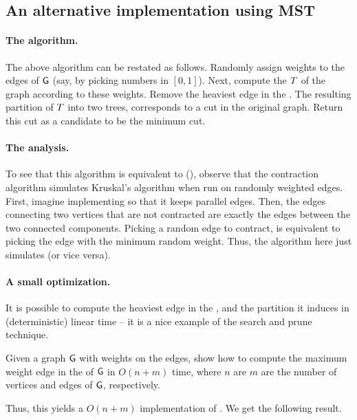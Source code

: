
\subsection{An alternative implementation using MST}

\paragraph*{The algorithm.}
The above algorithm can be restated as follows. Randomly assign
weights to the edges of $\mathsf{G}$ (say, by picking numbers in
$[0,1]$). Next, compute the \MST $T$ of the graph according to
these weights. Remove the heaviest edge in the \MST. The resulting
partition of $T$ into two trees, corresponds to a cut in the
original graph. Return this cut as a candidate to be the minimum cut. 

\paragraph*{The analysis.}
To see that this algorithm is equivalent to \MinCut
(), observe that the contraction algorithm
simulates Kruskal's \MST algorithm when run on randomly weighted
edges. First, imagine implementing \MinCut{} so that it keeps parallel
edges. Then, the edges connecting two vertices that are not
contracted are exactly the edges between the two connected
components. Picking a random edge to contract, is equivalent to
picking the edge with the minimum random weight. Thus, the \MST
algorithm here just simulates \MinCut{} (or vice versa). 

\paragraph*{A small optimization.}
It is possible to compute the heaviest edge in the \MST, and the
partition it induces in (deterministic) linear time -- it is a 
nice example of the search and prune technique.  
\begin{exercise}
    Given a graph $\mathsf{G}$ with weights on the edges, show how to compute
    the maximum weight edge in the \MST of $\mathsf{G}$ in $O(n + m)$ time,
    where $n$ are $m$ are the number of vertices and edges of $\mathsf{G}$,
    respectively.
\end{exercise}

Thus, this yields a $O(n + m)$ implementation of \MinCut{}. We get the
following result.

